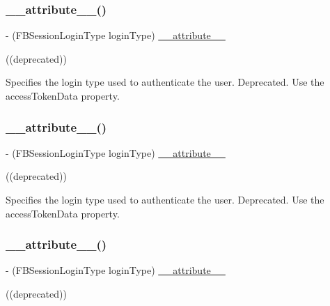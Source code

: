 \subsubsection{\texorpdfstring{\+\_\+\+\_\+attribute\+\_\+\+\_\+()}{\_\_attribute\_\_()}\hspace{0.1cm}{\footnotesize\ttfamily [13/25]}}
{\footnotesize\ttfamily -\/ (F\+B\+Session\+Login\+Type login\+Type) \hyperlink{struct____attribute____}{\+\_\+\+\_\+attribute\+\_\+\+\_\+} \begin{DoxyParamCaption}\item[{((deprecated))}]{ }\end{DoxyParamCaption}}

Specifies the login type used to authenticate the user.  Deprecated. Use the {\ttfamily access\+Token\+Data} property. \mbox{\label{interfaceFBSession_acd3c247502e2514d93ccf123ad4824f8}} 
\subsubsection{\texorpdfstring{\+\_\+\+\_\+attribute\+\_\+\+\_\+()}{\_\_attribute\_\_()}\hspace{0.1cm}{\footnotesize\ttfamily [14/25]}}
{\footnotesize\ttfamily -\/ (F\+B\+Session\+Login\+Type login\+Type) \hyperlink{struct____attribute____}{\+\_\+\+\_\+attribute\+\_\+\+\_\+} \begin{DoxyParamCaption}\item[{((deprecated))}]{ }\end{DoxyParamCaption}}

Specifies the login type used to authenticate the user.  Deprecated. Use the {\ttfamily access\+Token\+Data} property. \mbox{\label{interfaceFBSession_acd3c247502e2514d93ccf123ad4824f8}} 
\subsubsection{\texorpdfstring{\+\_\+\+\_\+attribute\+\_\+\+\_\+()}{\_\_attribute\_\_()}\hspace{0.1cm}{\footnotesize\ttfamily [15/25]}}
{\footnotesize\ttfamily -\/ (F\+B\+Session\+Login\+Type login\+Type) \hyperlink{struct____attribute____}{\+\_\+\+\_\+attribute\+\_\+\+\_\+} \begin{DoxyParamCaption}\item[{((deprecated))}]{ }\end{DoxyParamCaption}}

